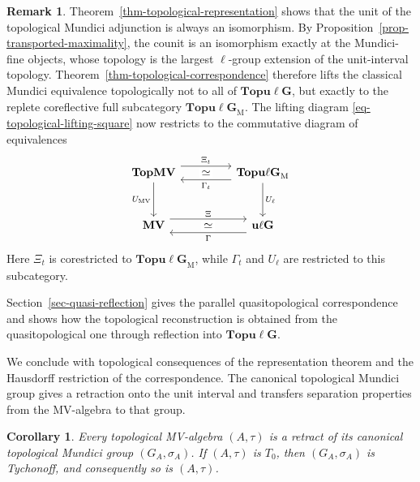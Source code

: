\documentclass[preprint,3p]{elsarticle}
\theoremstyle{plain}
\newtheorem{cor}[thm]{Corollary}
\theoremstyle{definition}
\newtheorem{rem}[thm]{Remark}
\newcommand{\TopMV}{\mathbf{TopMV}}
\newcommand{\Topulg}{\mathbf{Topu\ell G}}
\newcommand{\uLG}{\mathbf{u\ell G}}
\newcommand{\MV}{\mathbf{MV}}
\newcommand{\TopulgM}{\mathbf{Topu\ell G}_{\mathrm{M}}}
\numberwithin{equation}{section}
\begin{document}
\begin{rem}
Theorem~\ref{thm-topological-representation} shows that the unit
of the topological Mundici adjunction is always an isomorphism.
By Proposition~\ref{prop-transported-maximality}, the counit is an
isomorphism exactly at the Mundici-fine objects, whose topology is
the largest $\ell$-group extension of the unit-interval topology.
Theorem~\ref{thm-topological-correspondence} therefore lifts the
classical Mundici equivalence topologically not to all
of $\Topulg$, but exactly to the replete coreflective full subcategory
$\TopulgM$.
The lifting diagram \eqref{eq-topological-lifting-square} now restricts
to the commutative diagram of equivalences
\begin{equation}
\label{eq-topological-equivalence-square}
\begin{tikzcd}[column sep=4.5em,row sep=3em]
\TopMV
  \arrow[r,shift left=1.4ex,"\Xi_t"]
  \arrow[r,phantom,"\simeq" description]
  \arrow[d,"U_{\mathrm{MV}}"']
&
\TopulgM
  \arrow[l,shift left=1.4ex,"\Gamma_t"]
  \arrow[d,"U_{\ell}"]
\\
\MV
  \arrow[r,shift left=1.4ex,"\Xi"]
  \arrow[r,phantom,"\simeq" description]
&
\uLG
  \arrow[l,shift left=1.4ex,"\Gamma"]
\end{tikzcd}
\end{equation}
Here $\Xi_t$ is corestricted to $\TopulgM$, while $\Gamma_t$ and
$U_{\ell}$ are restricted to this subcategory.

Section~\ref{sec-quasi-reflection} gives the parallel quasitopological
correspondence and shows how the topological reconstruction is obtained
from the quasitopological one through reflection into $\Topulg$.
\end{rem}

We conclude with topological consequences of the representation
theorem and the Hausdorff restriction of the correspondence.
The canonical topological Mundici group gives a retraction onto the
unit interval and transfers separation properties from the MV-algebra
to that group.

\begin{cor}
\label{thm-retract-Tychonoff}
\label{thm-intro-group-envelope}
Every topological MV-algebra $(A,\tau)$ is a retract of its canonical
topological Mundici group $(G_A,\sigma_A)$.
If $(A,\tau)$ is $T_0$, then $(G_A,\sigma_A)$ is Tychonoff,
and consequently so is $(A,\tau)$.
\end{cor}
\end{document}
